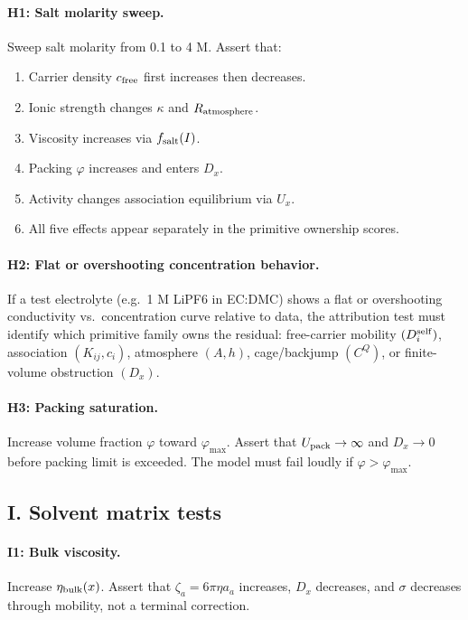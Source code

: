 \documentclass[11pt]{article}
\begin{document}
\paragraph{H1: Salt molarity sweep.}
Sweep salt molarity from 0.1 to 4 M. Assert that:
\begin{enumerate}
\item Carrier density \(c_{\rm free}\) first increases then decreases.
\item Ionic strength changes \(\kappa\) and \(R_{\rm atmosphere}\).
\item Viscosity increases via \(f_{\rm salt}(I)\).
\item Packing \(\varphi\) increases and enters \(D_x\).
\item Activity changes association equilibrium via \(U_x\).
\item All five effects appear separately in the primitive ownership scores.
\end{enumerate}

\paragraph{H2: Flat or overshooting concentration behavior.}
If a test electrolyte (e.g.\ 1 M LiPF6 in EC:DMC) shows a flat or
overshooting conductivity vs.\ concentration curve relative to data, the
attribution test must identify which primitive family owns the residual:
free-carrier mobility \((D_i^{\rm self})\), association \((K_{ij},c_i)\),
atmosphere \((A,h)\), cage/backjump \((C^Q)\), or finite-volume obstruction
\((D_x)\).

\paragraph{H3: Packing saturation.}
Increase volume fraction \(\varphi\) toward \(\varphi_{\max}\). Assert
that \(U_{\rm pack}\to\infty\) and \(D_x\to0\) before packing limit is
exceeded. The model must fail loudly if \(\varphi>\varphi_{\max}\).

\subsection{I. Solvent matrix tests}

\paragraph{I1: Bulk viscosity.}
Increase \(\eta_{\rm bulk}(x)\). Assert that \(\zeta_a=6\pi\eta a_a\)
increases, \(D_x\) decreases, and \(\sigma\) decreases through mobility,
not a terminal correction.
\end{document}
